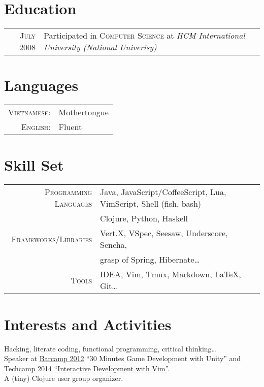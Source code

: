 \documentclass[a4paper,10pt]{article}
\begin{document}
\hfill
\section{Education}
\begin{tabular}{rl}	
    \textsc{July} 2008 & Participated in \textsc{Computer Science} at \textit{HCM International University (National Univerisy)}
\end{tabular}


\section{Languages}
\begin{tabular}{rl}
 \textsc{Vietnamese:}&Mothertongue\\
\textsc{English:}&Fluent\\
\end{tabular}

\section{Skill Set}
\begin{tabular}{rl}
    \textsc{Programming Languages} & Java, JavaScript/CoffeeScript, Lua, VimScript, Shell (fish, bash)\\
                                   & Clojure, Python, Haskell\\
    \textsc{Frameworks/Libraries} & Vert.X, VSpec, Seesaw, Underscore, Sencha,\\
                                  & grasp of Spring, Hibernate\ldots\\
    \textsc{Tools} & IDEA, Vim, Tmux, Markdown, \LaTeX, Git\ldots\\
\end{tabular}

\section{Interests and Activities}
Hacking, literate coding, functional programming, critical thinking\ldots\\
Speaker at \href{http://www.barcampsaigon.org/2012/09/thank-you-barcampers-sponsors-volunteers/}{Barcamp 2012} ``30 Minutes Game Development with Unity'' and Techcamp 2014 \href{http://www.slideshare.net/huylenq/interactive-development-with-vim-techcamp}{``Interactive Development with Vim''}.\\
A (tiny) Clojure user group organizer.\\
\end{document}

